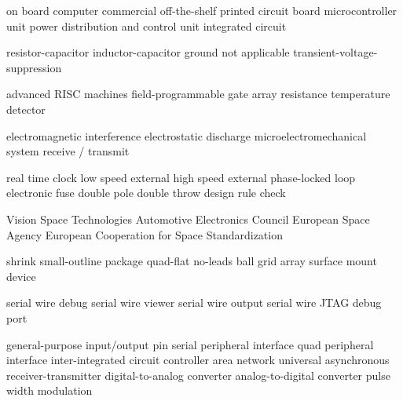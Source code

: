      {on board computer}
    {commercial off-the-shelf}
     {printed circuit board}
     {microcontroller unit}
    {power distribution and control unit}
      {integrated circuit}

      {resistor-capacitor}
      {inductor-capacitor}
     {ground}
      {not applicable}
     {transient-voltage-suppression}

     {advanced RISC machines}
    {field-programmable gate array}
     {resistance temperature detector}

     {electromagnetic interference}
     {electrostatic discharge}
    {microelectromechanical system}
   {receive / transmit}

     {real time clock}
     {low speed external}
     {high speed external}
     {phase-locked loop}
   {electronic fuse}
    {double pole double throw}
     {design rule check}

     {Vision Space Technologies}
     {Automotive Electronics Council}
     {European Space Agency}
   {European Cooperation for Space Standardization}

    {shrink small-outline package}
     {quad-flat no-leads}
     {ball grid array}
     {surface mount device}

     {serial wire debug}
     {serial wire viewer}
     {serial wire output}
  {serial wire JTAG debug port}

    {general-purpose input/output pin}
     {serial peripheral interface}
     {quad peripheral interface}
 {inter-integrated circuit}
     {controller area network}
    {universal asynchronous receiver-transmitter}
     {digital-to-analog converter}
     {analog-to-digital converter}
     {pulse width modulation}

